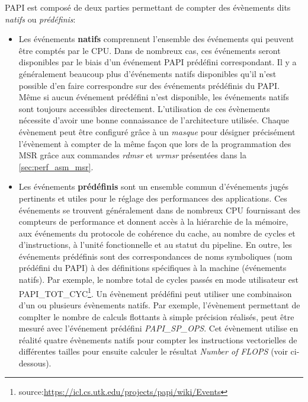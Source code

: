         
            PAPI est composé de deux parties permettant de compter des évènements dits \textit{natifs} ou \textit{prédéfinis}:
            \begin{itemize}
                \item Les événements \textbf{natifs} comprennent l'ensemble des événements qui peuvent être comptés par le CPU. Dans de nombreux cas, ces événements seront disponibles par le biais d'un événement PAPI prédéfini correspondant. Il y a généralement beaucoup plus d'événements natifs disponibles qu'il n'est possible d'en faire correspondre sur des événements prédéfinis du PAPI. Même si aucun événement prédéfini n'est disponible, les événements natifs sont toujours accessibles directement. L'utilisation de ces évènements nécessite d'avoir une bonne connaissance de l'architecture utilisée. Chaque évènement peut être configuré grâce à un \textit{masque} pour désigner précisément l'évènement à compter de la même façon que lors de la programmation des MSR grâce aux commandes \textit{rdmsr} et \textit{wrmsr} présentées dans la \autoref{sec:perf_asm_msr}. 
            
                \item Les événements \textbf{prédéfinis} sont un ensemble commun d'événements jugés pertinents et utiles pour le réglage des performances des applications. Ces événements se trouvent généralement dans de nombreux CPU fournissant des compteurs de performance et donnent accès à la hiérarchie de la mémoire, aux événements du protocole de cohérence du cache, au nombre de cycles et d'instructions, à l'unité fonctionnelle et au statut du pipeline. En outre, les événements prédéfinis sont des correspondances de noms symboliques (nom prédéfini du PAPI) à des définitions spécifiques à la machine (événements natifs). Par exemple, le nombre total de cycles passés en mode utilisateur est PAPI\_TOT\_CYC\footnote{source:\url{https://icl.cs.utk.edu/projects/papi/wiki/Events}}. Un évènement prédéfini peut utiliser une combinaison d'un ou plusieurs évènements natifs. Par exemple, l'évènement permettant de complter le nombre de calculs flottants à simple précision réalisés, peut être mesuré avec l'événement prédéfini \textit{PAPI\_SP\_OPS}. Cet évènement utilise en réalité quatre évènements natifs pour compter les instructions vectorielles de différentes tailles pour ensuite calculer le résultat \textit{Number of FLOPS} (voir ci-dessous).
            \end{itemize}
            
            

